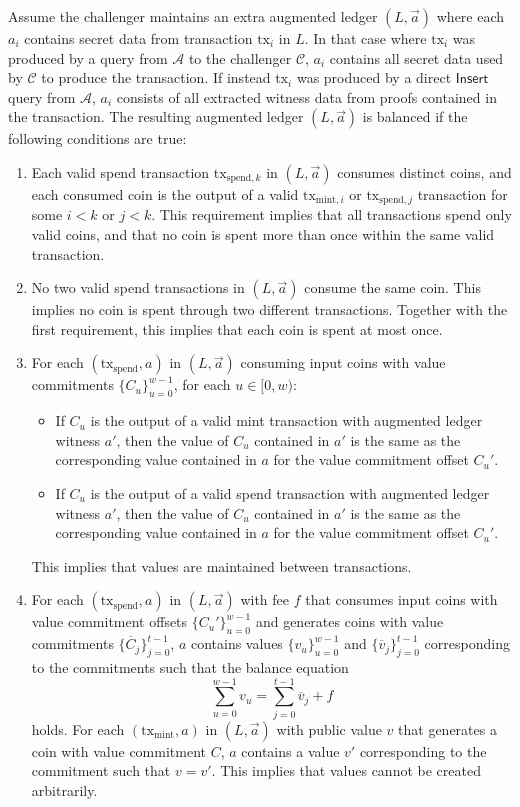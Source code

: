 \documentclass{llncs}
\newcommand{\func}[1]{\mathsf{#1}}
\begin{document}
Assume the challenger maintains an extra augmented ledger $(L, \vec{a})$ where each $a_i$ contains secret data from transaction $\text{tx}_i$ in $L$.
In that case where $\text{tx}_i$ was produced by a query from $\mathcal{A}$ to the challenger $\mathcal{C}$, $a_i$ contains all secret data used by $\mathcal{C}$ to produce the transaction.
If instead $\text{tx}_i$ was produced by a direct $\func{Insert}$ query from $\mathcal{A}$, $a_i$ consists of all extracted witness data from proofs contained in the transaction.
The resulting augmented ledger $(L, \vec{a})$ is balanced if the following conditions are true:
\begin{enumerate}
    \item\label{cond:distinct} Each valid spend transaction $\text{tx}_{\text{spend},k}$ in $(L, \vec{a})$ consumes distinct coins, and each consumed coin is the output of a valid $\text{tx}_{\text{mint},i}$ or $\text{tx}_{\text{spend},j}$ transaction for some $i < k$ or $j < k$.
    This requirement implies that all transactions spend only valid coins, and that no coin is spent more than once within the same valid transaction.
    
    \item\label{cond:multiple} No two valid spend transactions in $(L, \vec{a})$ consume the same coin.
    This implies no coin is spent through two different transactions.
    Together with the first requirement, this implies that each coin is spent at most once.
    
    \item\label{cond:value} For each $(\text{tx}_{\text{spend}}, a)$ in $(L, \vec{a})$ consuming input coins with value commitments $\{C_u\}_{u=0}^{w-1}$, for each $u \in [0,w)$:
    \begin{itemize}
        \item If $C_u$ is the output of a valid mint transaction with augmented ledger witness $a'$, then the value of $C_u$ contained in $a'$ is the same as the corresponding value contained in $a$ for the value commitment offset $C_u'$.
        \item If $C_u$ is the output of a valid spend transaction with augmented ledger witness $a'$, then the value of $C_u$ contained in $a'$ is the same as the corresponding value contained in $a$ for the value commitment offset $C_u'$.
    \end{itemize}
    This implies that values are maintained between transactions.
    
    \item\label{cond:balance} For each $(\text{tx}_{\text{spend}}, a)$ in $(L, \vec{a})$ with fee $f$ that consumes input coins with value commitment offsets $\{C_u'\}_{u=0}^{w-1}$ and generates coins with value commitments $\{\overline{C}_j\}_{j=0}^{t-1}$, $a$ contains values $\{v_u\}_{u=0}^{w-1}$ and $\{\overline{v}_j\}_{j=0}^{t-1}$ corresponding to the commitments such that the balance equation
    $$\sum_{u=0}^{w-1} v_u = \sum_{j=0}^{t-1} \overline{v}_j + f$$
    holds.
    For each $(\text{tx}_{\text{mint}}, a)$ in $(L, \vec{a})$ with public value $v$ that generates a coin with value commitment $C$, $a$ contains a value $v'$ corresponding to the commitment such that $v = v'$.
    This implies that values cannot be created arbitrarily.
    

\end{enumerate}
\end{document}
